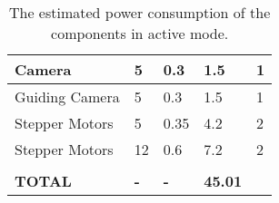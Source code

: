 \begin{center}
\begin{table}[H]
\begin{tabular}{|m{}|m{}|m{}|m{}|m{}|}
Camera                  & 5                               & 0.3                                 & 1.5                          & 1                 \\ \hline
Guiding Camera          & 5                               & 0.3                                 & 1.5                          & 1                 \\ \hline
Stepper Motors            & 5                              & 0.35                                & 4.2                          & 2                \\ \hline
Stepper Motors            & 12                              & 0.6                                & 7.2                          & 2                 \\ \hline                         \\ \hline
\textbf{TOTAL}          & \textbf{-}                      & \textbf{-}                   & \textbf{45.01}           &                   \\ \hline
\end{tabular}
\caption{The estimated power consumption of the components in active mode.}
\end{table}
\label{tab: power consumption}
\end{center}




\raggedbottom